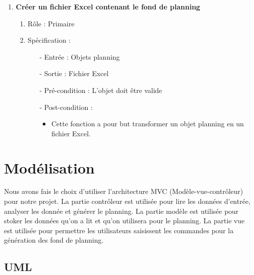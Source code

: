 \documentclass{polytech/polytech}
\begin{document}
\begin{enumerate}
		\item \textbf{Créer un fichier Excel contenant le fond de planning}
		\begin{enumerate}
			\item Rôle :  Primaire
			\item Spécification :
			\begin{itemize}
				\item[-] Entrée : Objets planning
				\item[-] Sortie : Fichier Excel
				\item[-] Pré-condition : L'objet doit être valide
				\item[-] Post-condition :
				\begin{itemize}[label=\textbullet, font=\LARGE]
					\item Cette fonction a pour but transformer un objet planning en un fichier Excel.
				\end{itemize}
			\end{itemize}
		\end{enumerate}
	\end{enumerate}

	\section{Modélisation}

	Nous avons fais le choix d'utiliser l'architecture MVC (Modèle-vue-contrôleur) pour notre projet.
	La partie contrôleur est utilisée pour lire les données d'entrée, analyser les donnée et générer le planning.
	La partie modèle est utilisée pour stoker les données qu'on a lit et qu'on utilisera pour le planning.
	La partie vue est utilisée pour permettre les utilisateurs saisissent les commandes pour la génération des fond de planning.
	
	\pagebreak

	\subsection{UML}
	
\end{document}
